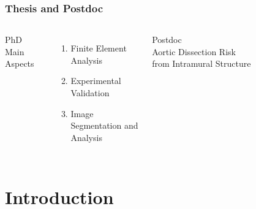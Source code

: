 \documentclass[xcolor=table,11pt]{beamer}
\begin{document}
	\begin{frame}
			\frametitle{Thesis and Postdoc}
			\begin{columns}
					PhD Main Aspects
					\begin{enumerate}
							\item Finite Element Analysis
							\item Experimental Validation
							\item Image Segmentation and Analysis
					\end{enumerate}
					\vspace{5mm}
					Postdoc\\
					Aortic Dissection Risk from Intramural Structure
					\centering
					\begin{figure}
					\end{figure}
			\end{columns}
	\end{frame}

	
	\section{Introduction}
\end{document}
